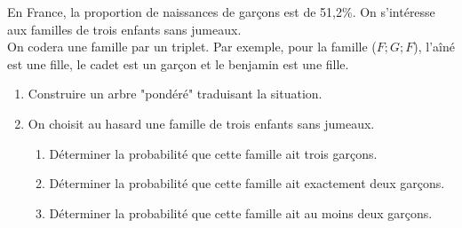 \medskip
\exo
En France, la proportion de naissances de garçons est de 51,2\%. \og On s'intéresse aux familles de trois enfants sans jumeaux. \fg \\
On codera une famille par un triplet. Par exemple, pour la famille ($ F ; G ; F $), l'aîné est une fille, le cadet est un garçon et le benjamin est une fille.
\begin{enumerate}
\item Construire un arbre "pondéré" traduisant la situation.
\item On choisit au hasard une famille de trois enfants sans jumeaux.
\begin{enumerate}
\item Déterminer la probabilité que cette famille ait trois garçons.
\item Déterminer la probabilité que cette famille ait exactement deux garçons.
\item Déterminer la probabilité que cette famille ait au moins deux garçons.
\end{enumerate}
\end{enumerate}

